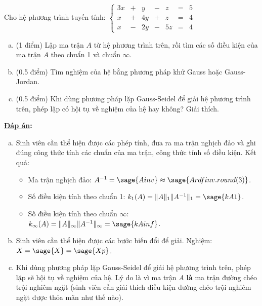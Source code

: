 \documentclass[12pt]{article}
\newcommand{\Solution}{
\medskip
{\bf \underline{Đáp án}:}
}
\begin{document}
Cho hệ phương trình tuyến tính:
$
\left\lbrace \begin{array}{rrrrrrr}
    3x &+& y &-& z &=& 5\\
    x &+& 4y &+& z &=& 4\\
    x &-& 2y &-& 5z &=& 4
             \end{array}
  \right.
$  
\begin{enumerate}[a).]
 \item (1 điểm) Lập ma trận $A$ từ hệ phương trình trên, rồi tìm các số điều kiện của ma trận $A$ theo chuẩn 1 và chuẩn $\infty$.
 \item (0.5 điểm) Tìm nghiệm của hệ bằng phương pháp khử Gauss hoặc Gauss-Jordan.
 \item (0.5 điểm) Khi dùng phương pháp lặp Gauss-Seidel để giải hệ phương trình trên, phép lặp có hội tụ về nghiệm của hệ hay không? Giải thích.
\end{enumerate}

\Solution

\begin{enumerate}[a)]
 \item Sinh viên cần thể hiện được các phép tính, đưa ra ma trận nghịch đảo và ghi đúng công thức tính các chuẩn của ma trận, công thức tính số điều kiện. Kết quả: 
 \begin{itemize}
  \item Ma trận nghịch đảo: $A^{-1} = \sage{Ainv} \approx \sage{Ardfinv.round(3)}$.
  \item Số điều kiện tính theo chuẩn 1:  $k_1(A)=\|A\|_1 \|A^{-1}\|_1=\sage{kA1}$.
  \item Số điều kiện tính theo chuẩn $\infty$:  $k_{\infty}(A)=\|A\|_{\infty} \|A^{-1}\|_{\infty}=\sage{kAinf}$.
 \end{itemize}
 \item Sinh viên cần thể hiện được các bước biến đổi để giải. Nghiệm: $X=\sage{X}=\sage{Xp}$.
 \item Khi dùng phương pháp lặp Gauss-Seidel để giải hệ phương trình trên, phép lặp sẽ hội tụ về nghiệm của hệ. Lý do là vì ma trận $A$ \textbf{là} ma trận đường chéo trội nghiêm ngặt (sinh viên cần giải thích điều kiện đường chéo trội nghiêm ngặt được thỏa mãn như thế nào).
\end{enumerate}
\end{document}
